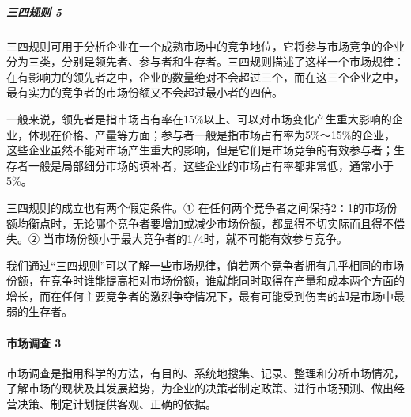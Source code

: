 \documentclass[letterpaper,11pt,english]{sphinxmanual}
\begin{document}
\subparagraph{三四规则 5\sphinxfootnotemark[169]}
\label{\detokenize{chapter_skill/industry_analysis:id6}}%
\begin{footnotetext}[169]\sphinxAtStartFootnote
{}
%
\end{footnotetext}\ignorespaces 
三四规则可用于分析企业在一个成熟市场中的竞争地位，它将参与市场竞争的企业分为三类，分别是领先者、参与者和生存者。三四规则描述了这样一个市场规律：在有影响力的领先者之中，企业的数量绝对不会超过三个，而在这三个企业之中，最有实力的竞争者的市场份额又不会超过最小者的四倍。

一般来说，领先者是指市场占有率在15\%以上、可以对市场变化产生重大影响的企业，体现在价格、产量等方面；参与者一般是指市场占有率为5\%～15\%的企业，这些企业虽然不能对市场产生重大的影响，但是它们是市场竞争的有效参与者；生存者一般是局部细分市场的填补者，这些企业的市场占有率都非常低，通常小于5\%。

三四规则的成立也有两个假定条件。①
在任何两个竞争者之间保持2∶1的市场份额均衡点时，无论哪个竞争者要增加或减少市场份额，都显得不切实际而且得不偿失。②
当市场份额小于最大竞争者的1/4时，就不可能有效参与竞争。

我们通过“三四规则”可以了解一些市场规律，倘若两个竞争者拥有几乎相同的市场份额，在竞争时谁能提高相对市场份额，谁就能同时取得在产量和成本两个方面的增长，而在任何主要竞争者的激烈争夺情况下，最有可能受到伤害的却是市场中最弱的生存者。


\paragraph{市场调查 3\sphinxfootnotemark[170]}
\label{\detokenize{chapter_skill/industry_analysis:id7}}%
\begin{footnotetext}[170]\sphinxAtStartFootnote
{}
%
\end{footnotetext}\ignorespaces 
市场调查是指用科学的方法，有目的、系统地搜集、记录、整理和分析市场情况，了解市场的现状及其发展趋势，为企业的决策者制定政策、进行市场预测、做出经营决策、制定计划提供客观、正确的依据。
\end{document}

